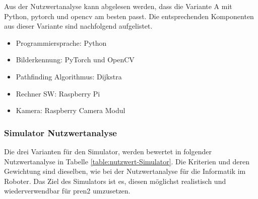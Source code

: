 Aus der Nutzwertanalyse kann abgelesen werden, dass die Variante A mit Python, \gls{pytorch} und \gls{opencv} am besten passt. Die entsprechenden Komponenten aus dieser Variante sind nachfolgend aufgelistet.

\begin{itemize}
    \item Programmiersprache: Python
    \item Bilderkennung: PyTorch und OpenCV
    \item Pathfinding Algorithmus: Dijkstra
    \item Rechner SW: Raspberry Pi
    \item Kamera: Raspberry Camera Modul
\end{itemize}

\subsubsection*{Simulator Nutzwertanalyse}


Die drei Varianten für den Simulator, werden bewertet in folgender Nutzwertanalyse in Tabelle \ref{table:nutzwert-Simulator}. Die Kriterien und deren Gewichtung sind dieselben, wie bei der Nutzwertanalyse für die Informatik im Roboter. Das Ziel des Simulators ist es, diesen möglichst realistisch und wiederverwendbar für \acrshort{pren2} umzusetzen.

